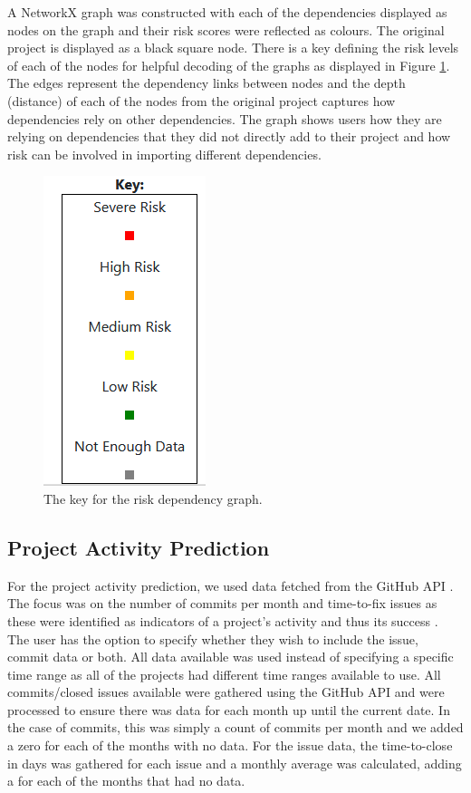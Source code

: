 \documentclass[conference]{IEEEtran}
\begin{document}
A NetworkX graph was constructed with each of the dependencies displayed as nodes on the graph and their risk scores were reflected as colours. The original project is displayed as a black square node. There is a key defining the risk levels of each of the nodes for helpful decoding of the graphs as displayed in Figure \ref{fig:key}. The edges represent the dependency links between nodes and the depth (distance) of each of the nodes from the original project captures how dependencies rely on other dependencies. The graph shows users how they are relying on dependencies that they did not directly add to their project and how risk can be involved in importing different dependencies. 

\begin{figure}
\begin{center}
    \includegraphics[scale=0.5]{Key.png}
    \caption{The key for the risk dependency graph.}
    \label{fig:key}
\end{center}
\end{figure}

\subsection{Project Activity Prediction}
For the project activity prediction, we used data fetched from the GitHub API \cite{noauthor_github_nodate}. The focus was on the number of commits per month and time-to-fix issues as these were identified as indicators of a project's activity and thus its success \cite{sen_open_2012, chahal_fuzzy_2016}. The user has the option to specify whether they wish to include the issue, commit data or both. All data available was used instead of specifying a specific time range as all of the projects had different time ranges available to use. All commits/closed issues available were gathered using the GitHub API and were processed to ensure there was data for each month up until the current date. In the case of commits, this was simply a count of commits per month and we added a zero for each of the months with no data. For the issue data, the time-to-close in days was gathered for each issue and a monthly average was calculated, adding a  for each of the months that had no data. 
\end{document}
